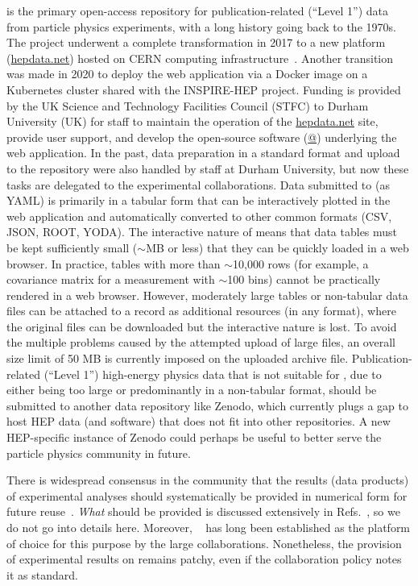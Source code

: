 \documentclass[11pt]{article}
\begin{document}
\hepdata is the primary open-access repository for publication-related (``Level 1'') data from particle physics experiments, with a long history going back to the 1970s.  The \hepdata project underwent a complete transformation in 2017 to a new platform (\url{hepdata.net}) hosted on CERN computing infrastructure~\cite{hepdata}.  Another transition was made in 2020 to deploy the web application via a Docker image on a Kubernetes cluster shared with the INSPIRE-HEP project.  Funding is provided by the UK Science and Technology Facilities Council (STFC) to Durham University (UK) for staff to maintain the operation of the \url{hepdata.net} site, provide user support, and develop the open-source software (\href{https://github.com/HEPData}{@\hepdata}) underlying the web application.  In the past, data preparation in a standard format and upload to the repository were also handled by \hepdata staff at Durham University, but now these tasks are delegated to the experimental collaborations.  Data submitted to \hepdata (as YAML) is primarily in a tabular form that can be interactively plotted in the web application and automatically converted to other common formats (CSV, JSON, ROOT, YODA).  The interactive nature of \hepdata means that data tables must be kept sufficiently small ($\sim$MB or less) that they can be quickly loaded in a web browser.  In practice, tables with more than $\sim$10,000 rows (for example, a covariance matrix for a measurement with $\sim$100 bins) cannot be practically rendered in a web browser.  However, moderately large tables or non-tabular data files can be attached to a \hepdata record as additional resources (in any format), where the original files can be downloaded but the interactive nature is lost.  To avoid the multiple problems caused by the attempted upload of large files, an overall size limit of 50 MB is currently imposed on the uploaded archive file.  Publication-related (``Level 1'') high-energy physics data that is not suitable for \hepdata, due to either being too large or predominantly in a non-tabular format, should be submitted to another data repository like Zenodo, which currently plugs a gap to host HEP data (and software) that does not fit into other repositories.  A new HEP-specific instance of Zenodo could perhaps be useful to better serve the particle physics community in future.

There is widespread consensus in the community that the results (data products) of experimental analyses should systematically be provided in numerical form for future reuse~\cite{LHCReinterpretationForum:2020xtr}. 
\emph{What} should be provided is discussed extensively in Refs.~\cite{LHCReinterpretationForum:2020xtr,Cranmer:2021urp}, so we do not go into details here. Moreover,  
\hepdata~\cite{hepdata} has long been established as the platform of choice for this purpose by the large collaborations. Nonetheless, the provision of experimental results on \hepdata remains patchy, even if the collaboration policy notes it as standard.  
\end{document}
